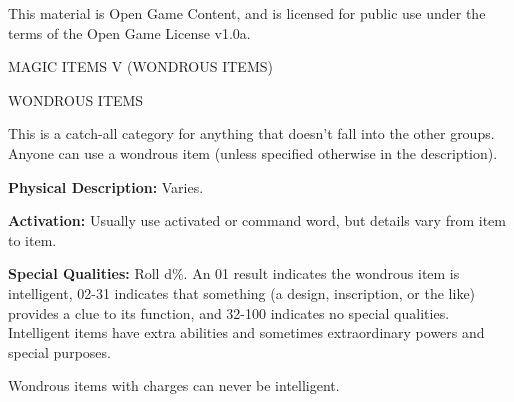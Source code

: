 \documentclass{article}
\begin{document}
This material is Open Game Content, and is licensed for public use under the terms 
of the Open Game License v1.0a.

{\LARGE{}MAGIC ITEMS V (WONDROUS ITEMS)}

\vspace{12pt}
WONDROUS ITEMS

This is a catch-all category for anything that doesn't fall into the other groups. 
Anyone can use a wondrous item (unless specified otherwise in the description).

\textbf{Physical Description:} Varies.

\textbf{Activation:} Usually use activated or command word, but details vary from 
item to item.

\textbf{Special Qualities:} Roll d\%. An 01 result indicates the wondrous item 
is intelligent, 02-31 indicates that something (a design, inscription, or the like) 
provides a clue to its function, and 32-100 indicates no special qualities. Intelligent 
items have extra abilities and sometimes extraordinary powers and special purposes.

Wondrous items with charges can never be intelligent.
\end{document}
